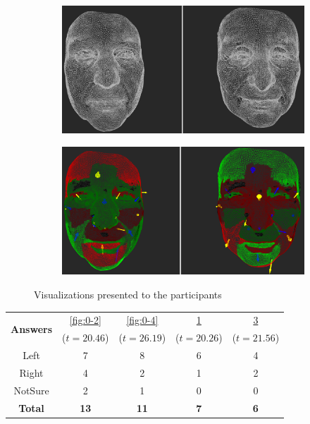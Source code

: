 \begin{figure}[h]
\begin{subfigure}{0.4\textwidth}
\includegraphics[width=\textwidth]{./screenshots/pair1.PNG}
\caption{}
\label{fig:0-1}
\end{subfigure}
\quad
\begin{subfigure}{0.4\textwidth}
\includegraphics[width=\textwidth]{./screenshots/pair3.PNG}
\caption{}
\label{fig:0-3}
\end{subfigure}
\caption{Visualizations presented to the participants}
\end{figure}
\medskip
\begin{center}
\begin{tabular}{| c | c | c | c | c |}
	\hline
\multirow{2}{*}{\bf Answers} & \ref{fig:0-2} & \ref{fig:0-4} & \ref{fig:0-1} & \ref{fig:0-3}\\
	&  (\(t=20.46\)) &  (\(t=26.19\)) &  (\(t=20.26\)) &  (\(t=21.56\))\\ \hline
	Left & 7 & 8 & 6 & 4\\ \hline
	Right & 4 & 2 & 1 & 2\\ \hline
	NotSure & 2 & 1 & 0 & 0\\ \hline
	{\bf Total} & {\bf 13} & {\bf 11} & {\bf 7} & {\bf 6}\\ \hline
\end{tabular}
\end{center}
\clearpage

